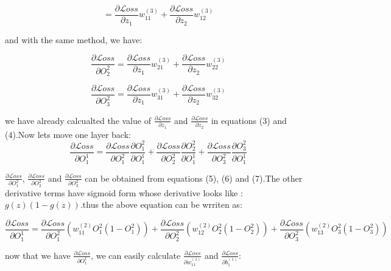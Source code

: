 \documentclass{article}
\newcommand{\loss}{\mathcal{L}oss}
\begin{document}
\begin{equation}
    = \frac{\partial{\loss}}{\partial{z_{1}}}w_{11}^{(3)} + \frac{\partial{\loss}}{\partial{z_{2}}}w_{12}^{(3)}
\end{equation}

and with the same method, we have:

\begin{equation}
    \frac{\partial{\loss}}{\partial{O_{2}^{2}}} = \frac{\partial{\loss}}{\partial{z_{1}}}w_{21}^{(3)} + \frac{\partial{\loss}}{\partial{z_{2}}}w_{22}^{(3)}
\end{equation}

\begin{equation}
    \frac{\partial{\loss}}{\partial{O_{3}^{2}}} = \frac{\partial{\loss}}{\partial{z_{1}}}w_{31}^{(3)} + \frac{\partial{\loss}}{\partial{z_{2}}}w_{32}^{(3)}
\end{equation}

we have already calcualted the value of $\frac{\partial{\loss}}{\partial{z_{1}}}$ and $\frac{\partial{\loss}}{\partial{z_{2}}}$ in equations (3) and (4).Now lets move one layer back:
\begin{equation*}
    \frac{\partial{\loss}}{\partial{O_{1}^{1}}} = \frac{\partial{\loss}}{\partial{O_{1}^{2}}}\frac{\partial{O_{1}^{2}}}{\partial{O_{1}^{1}}}
    + \frac{\partial{\loss}}{\partial{O_{2}^{2}}}\frac{\partial{O_{2}^{2}}}{\partial{O_{1}^{1}}}
    + \frac{\partial{\loss}}{\partial{O_{3}^{2}}}\frac{\partial{O_{3}^{2}}}{\partial{O_{1}^{1}}}
\end{equation*}

$\frac{\partial{\loss}}{\partial{O_{1}^{2}}}$, $\frac{\partial{\loss}}{\partial{O_{2}^{2}}}$ and $\frac{\partial{\loss}}{\partial{O_{3}^{2}}}$ can be obtained from equations (5), (6) and (7).The other derivative terms have sigmoid form whose derivative looks like : $g(z)(1 - g(z))$.thus the above equation can be wrriten as:

\begin{equation}
    \frac{\partial{\loss}}{\partial{O_{1}^{1}}} = \frac{\partial{\loss}}{\partial{O_{1}^{2}}}(w_{11}^{(2)}O_{1}^{2}(1 - O_{1}^{2}))
    + \frac{\partial{\loss}}{\partial{O_{2}^{2}}}(w_{12}^{(2)}O_{2}^{2}(1 - O_{2}^{2}))
    + \frac{\partial{\loss}}{\partial{O_{3}^{2}}}(w_{13}^{(2)}O_{3}^{2}(1 - O_{3}^{2}))
\end{equation}


now that we have $\frac{\partial{\loss}}{\partial{O_{1}^{1}}}$, we can easily calculate $\frac{\partial{\loss}}{\partial{w_{11}^{(1)}}}$ and $\frac{\partial{\loss}}{\partial{b_{1}^{(1)}}}$:
\end{document}

